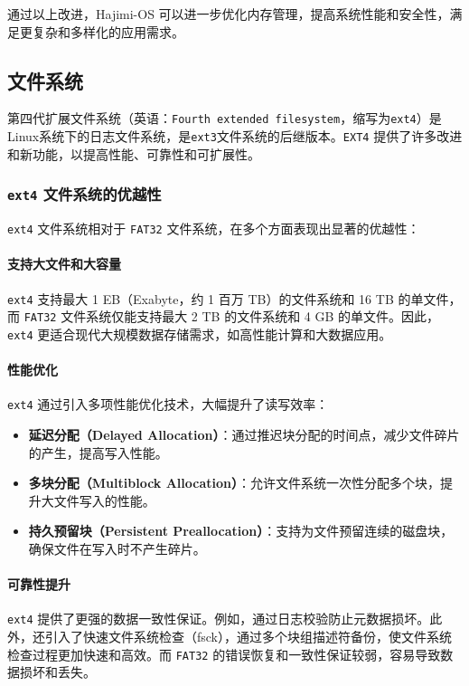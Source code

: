 \documentclass[UTF8]{article}
\begin{document}
通过以上改进，Hajimi-OS 可以进一步优化内存管理，提高系统性能和安全性，满足更复杂和多样化的应用需求。

\subsection{文件系统}
第四代扩展文件系统（英语：\texttt{Fourth extended filesystem}，缩写为\texttt{ext4}）是Linux系统下的日志文件系统，是\texttt{ext3}文件系统的后继版本。\texttt{EXT4} 提供了许多改进和新功能，以提高性能、可靠性和可扩展性。
\subsubsection{\texttt{ext4} 文件系统的优越性}

\texttt{ext4} 文件系统相对于 \texttt{FAT32} 文件系统，在多个方面表现出显著的优越性：

\paragraph{支持大文件和大容量}
\texttt{ext4} 支持最大 1 EB（Exabyte，约 1 百万 TB）的文件系统和 16 TB 的单文件，而 \texttt{FAT32} 文件系统仅能支持最大 2 TB 的文件系统和 4 GB 的单文件。因此，\texttt{ext4} 更适合现代大规模数据存储需求，如高性能计算和大数据应用。

\paragraph{性能优化}
\texttt{ext4} 通过引入多项性能优化技术，大幅提升了读写效率：
\begin{itemize}
  \item \textbf{延迟分配（Delayed Allocation）}：通过推迟块分配的时间点，减少文件碎片的产生，提高写入性能。
  \item \textbf{多块分配（Multiblock Allocation）}：允许文件系统一次性分配多个块，提升大文件写入的性能。
  \item \textbf{持久预留块（Persistent Preallocation）}：支持为文件预留连续的磁盘块，确保文件在写入时不产生碎片。
\end{itemize}

\paragraph{可靠性提升}
\texttt{ext4} 提供了更强的数据一致性保证。例如，通过日志校验防止元数据损坏。此外，还引入了快速文件系统检查（fsck），通过多个块组描述符备份，使文件系统检查过程更加快速和高效。而 \texttt{FAT32} 的错误恢复和一致性保证较弱，容易导致数据损坏和丢失。
\end{document}
